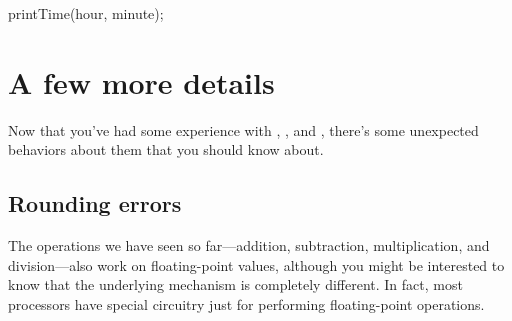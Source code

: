 \begin{code}
    printTime(hour, minute);
\end{code}


%
%
%
%
%
%
%
%


\section{A few more details}

Now that you've had some experience with , , and , there's some unexpected behaviors about them that you should know about.

\subsection{Rounding errors}


The operations we have seen so far---addition, subtraction, multiplication, and division---also work on floating-point values, although you might be interested to know that the underlying mechanism is completely different.
In fact, most processors have special circuitry just for performing floating-point operations.

